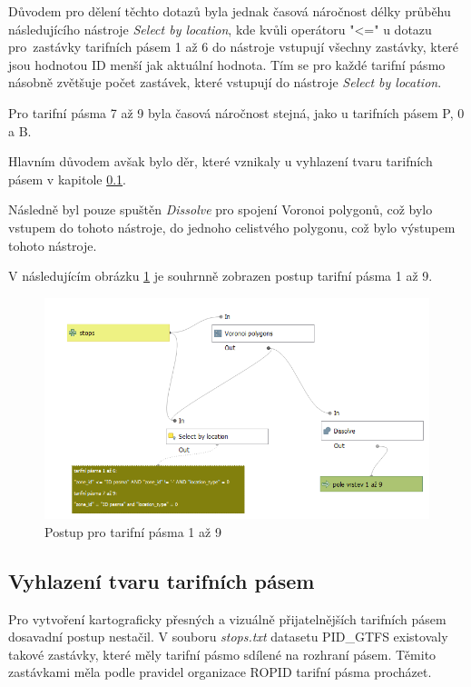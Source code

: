 Důvodem pro dělení těchto dotazů byla jednak časová náročnost délky průběhu následujícího nástroje \textit{Select by location}, 
kde kvůli operátoru "<=" u dotazu pro~zastávky tarifních pásem 1 až 6 do nástroje vstupují všechny zastávky, 
které jsou hodnotou ID menší jak aktuální hodnota. Tím se pro každé tarifní pásmo násobně zvětšuje počet zastávek,
které vstupují do nástroje \textit{Select by location}.

Pro tarifní pásma 7 až 9 byla časová náročnost stejná, jako u tarifních pásem P, 0 a B.

Hlavním důvodem avšak bylo  děr, které vznikaly u vyhlazení tvaru tarifních pásem v kapitole \ref{vyhlazeni}.  

Následně byl pouze spuštěn \textit{Dissolve} pro spojení Voronoi polygonů, což bylo vstupem do tohoto nástroje,
do jednoho celistvého polygonu, což bylo výstupem tohoto nástroje.

V následujícím obrázku \ref{fig:postup-voronoi-1az9} je souhrnně zobrazen postup tarifní pásma 1 až 9.

\begin{figure}[H] \centering
    \includegraphics[width=400pt]{./pictures/postup-voronoi-1az9.png}
    \caption[Postup pro tarifní pásma 1 až 9]{Postup pro tarifní pásma 1 až 9}
	\label{fig:postup-voronoi-1az9}              
\end{figure}

\subsection{Vyhlazení tvaru tarifních pásem}
\label{vyhlazeni}

Pro vytvoření kartograficky přesných a vizuálně přijatelnějších tarifních pásem dosa\-vadní postup nestačil.
V souboru \textit{stops.txt} datasetu PID\_GTFS existovaly takové zastávky, které měly tarifní pásmo sdílené
na rozhraní pásem. Těmito zastávkami měla podle pravidel organizace ROPID tarifní pásma procházet.

